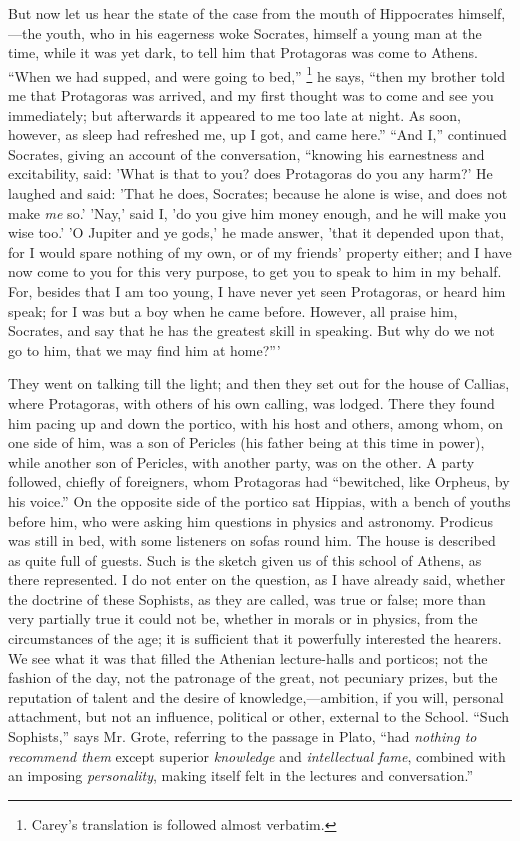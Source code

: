 But now let us hear the state of the case from the mouth of
Hippocrates himself,—the youth, who in his eagerness woke Socrates,
himself a young man at the time, while it was yet dark, to tell him
that Protagoras was come to Athens. ``When we had supped, and were
going to bed,'' \footnote{Carey's translation is followed almost verbatim.} he
says, ``then my brother told me that Protagoras was arrived, and
my first thought was to come and see you immediately; but afterwards
it appeared to me too late at night. As soon, however, as sleep had
refreshed me, up I got, and came here.'' ``And I,''
continued Socrates, giving an account of the conversation,
``knowing his earnestness and excitability, said: 'What is
that to you? does Protagoras do you any harm?' He laughed and said:
'That he does, Socrates; because he alone is wise, and does not make \emph{me}
so.' 'Nay,' said I, 'do you give him money enough, and he will make
you wise too.' 'O Jupiter and ye gods,' he made answer, 'that it
depended upon that, for I would spare nothing of my own, or of my
friends' property either; and I have now come to you for this very
purpose, to get you to speak to him in my behalf. For, besides that I
am too young, I have never yet seen Protagoras, or heard him speak;
for I was but a boy when he came before. However, all praise him,
Socrates, and say that he has the greatest skill in speaking. But why
do we not go to him, that we may find him at home?'''

They went on talking till the light; and then they set out for the
house of Callias, where Protagoras, with others of his own calling,
was lodged. There they found him pacing up and down the portico, with
his host and others, among whom, on one side of him, was a son of
Pericles (his father being at this time in power), while another son
of Pericles, with another party, was on the other. A party followed,
chiefly of foreigners, whom Protagoras had ``bewitched, like
Orpheus, by his voice.'' On the opposite side of the portico sat
Hippias, with a bench of youths before him, who were asking him
questions in physics and astronomy. Prodicus was still in bed, with
some listeners on sofas round him. The house is described as quite
full of guests. Such is the sketch given us of this school of Athens,
as there represented. I do not enter on the question, as I have
already said, whether the doctrine of these Sophists, as they are
called, was true or false; more than very partially true it could not
be, whether in morals or in physics, from the circumstances of
the age; it is sufficient that it powerfully interested the hearers.
We see what it was that filled the Athenian lecture-halls and
porticos; not the fashion of the day, not the patronage of the great,
not pecuniary prizes, but the reputation of talent and the desire of
knowledge,—ambition, if you will, personal attachment, but not an
influence, political or other, external to the School. ``Such
Sophists,'' says Mr. Grote, referring to the passage in Plato,
``had \emph{nothing to recommend them} except superior \emph{knowledge}
and \emph{intellectual fame}, combined with an imposing \emph{personality},
making itself felt in the lectures and conversation.''

